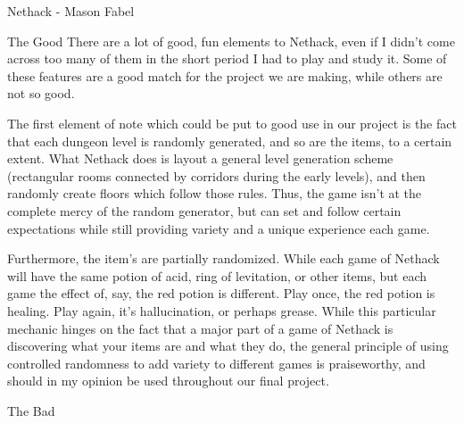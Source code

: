 \documentclass[12pt]{report}
\begin{document}
\begin{section}{Nethack - Mason Fabel}
\begin{subsection}{The Good}
There are a lot of good, fun elements to Nethack, even if I didn't come
across too many of them in the short period I had to play and study it.
Some of these features are a good match for the project we are making,
while others are not so good.

The first element of note which could be put to good use in our project
is the fact that each dungeon level is randomly generated, and so are
the items, to a certain extent. What Nethack does is layout a general
level generation scheme (rectangular rooms connected by corridors during
the early levels), and then randomly create floors which follow those
rules. Thus, the game isn't at the complete mercy of the random generator,
but can set and follow certain expectations while still providing variety
and a unique experience each game.

Furthermore, the item's are partially randomized. While each game of
Nethack will have the same potion of acid, ring of levitation, or other
items, but each game the effect of, say, the red potion is different.
Play once, the red potion is healing. Play again, it's hallucination, or
perhaps grease. While this particular mechanic hinges on the fact that a
major part of a game of Nethack is discovering what your items are and
what they do, the general principle of using controlled randomness to add
variety to different games is praiseworthy, and should in my opinion be
used throughout our final project.
\end{subsection}

\begin{subsection}{The Bad}
\end{subsection}

\end{section}
\end{document}
